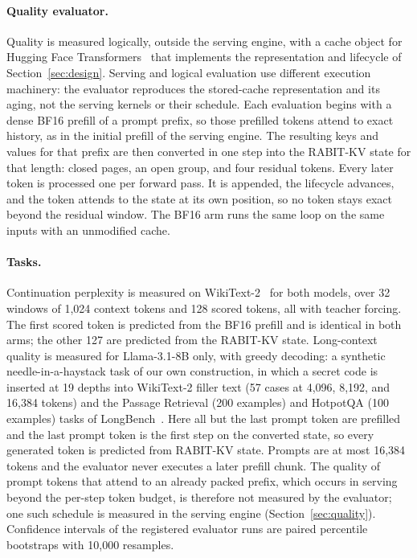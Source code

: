 \documentclass{article}
\begin{document}
\paragraph{Quality evaluator.}
Quality is measured logically, outside the serving engine, with a cache object for Hugging Face
Transformers~\citep{wolf2019transformers} that implements the representation and lifecycle of
Section~\ref{sec:design}. Serving and logical evaluation use different execution machinery: the
evaluator reproduces the stored-cache representation and its aging, not the serving kernels or their
schedule. Each evaluation begins with a dense BF16 prefill of a prompt prefix, so those prefilled
tokens attend to exact history, as in the initial prefill of the serving engine. The resulting keys and
values for that prefix are then converted in one step into the RABIT-KV state for that length: closed pages,
an open group, and four residual tokens. Every later token is processed one per forward pass. It is
appended, the lifecycle advances, and the token attends to the state at its own position, so no token
stays exact beyond the residual window. The BF16 arm runs the same loop on the same inputs with an
unmodified cache.

\paragraph{Tasks.}
Continuation perplexity is measured on WikiText-2~\citep{merity2016pointer} for both models, over 32 windows of 1,024
context tokens and 128 scored tokens, all with teacher forcing. The first scored token is predicted
from the BF16 prefill and is identical in both arms; the other 127 are predicted from the RABIT-KV
state. Long-context
quality is measured for Llama-3.1-8B only, with greedy decoding: a synthetic needle-in-a-haystack task of our own construction, in which a
secret code is inserted at 19 depths into WikiText-2 filler text
(57 cases at 4,096, 8,192, and 16,384 tokens) and the Passage Retrieval (200 examples) and HotpotQA
(100 examples) tasks of LongBench~\citep{bai2024longbench,yang2018hotpotqa}. Here all but the last prompt token are
prefilled and the last prompt token is the first step on the converted state, so every generated token
is predicted from RABIT-KV state. Prompts are at most 16,384 tokens and the evaluator never executes a
later prefill chunk. The quality of prompt tokens that attend to an already packed prefix, which occurs
in serving beyond the per-step token budget, is therefore not measured by the evaluator; one such schedule
is measured in the serving engine (Section~\ref{sec:quality}). Confidence intervals of the registered
evaluator runs are paired percentile bootstraps with 10,000 resamples.
\end{document}
